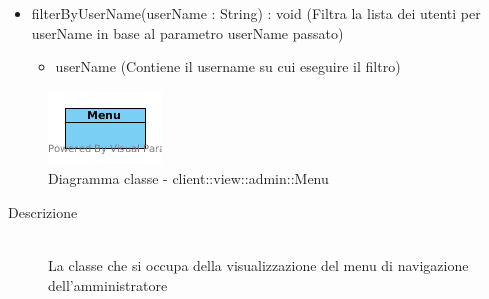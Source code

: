 \begin{description}
\begin{itemize}
\item filterByUserName(userName : String) : void (Filtra la lista dei utenti per userName in base al parametro userName passato)\begin{itemize}
\item userName (Contiene il username su cui eseguire il filtro)
\end{itemize}

\end{itemize}

\end{description}

\vspace{0.5cm}
\hypertarget{client::view::admin::Menu}{}
\begin{center}
			\begin{figure}[H]
				\centering \includegraphics[scale=4, max width=\textwidth, max height=\myheight]{../img/diagrammiClassi/client/view/admin/Menu.png}
				\caption{Diagramma classe - client::view::admin::Menu}
			\end{figure}
		\end{center}\begin{description}
\item[Descrizione] \hfill \\
 La classe che si occupa della visualizzazione del menu di navigazione dell'amministratore
\end{description}

\vspace{0.5cm}
